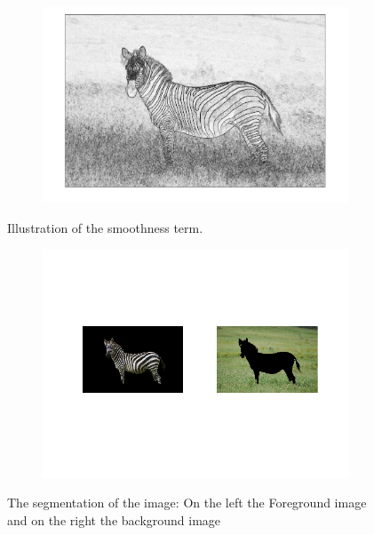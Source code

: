 \documentclass{paper}
\begin{document}
\begin{figure}[H]
    \centering
    \begin{subfigure}{1.0\textwidth}
        \includegraphics[width=\textwidth]{../../outputs/p4/image_segmentation/zebra/gamma20/smoothness}
    \end{subfigure}
    \caption{Illustration of the smoothness term.}
    \label{fig:segmentation_zebra_smoothness}       
\end{figure}

\begin{figure}[H]
    \centering
    \begin{subfigure}{1.0\textwidth}
        \includegraphics[width=\textwidth]{../../outputs/p4/image_segmentation/zebra/gamma20/segmentation}
    \end{subfigure}
    \caption{The segmentation of the image: On the left the Foreground image and on the right the background image}
    \label{fig:segmentation_zebra_segmenation}       
\end{figure}
\end{document}
